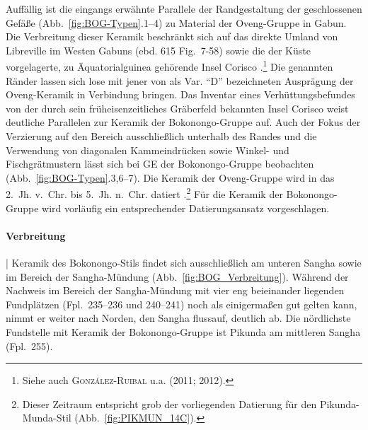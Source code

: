 Auffällig ist die eingangs erwähnte Parallele der Randgestaltung der geschlossenen Gefäße (Abb.~\ref{fig:BOG-Typen}.1--4) zu Material der Oveng-Gruppe in Gabun. Die Verbreitung dieser Keramik beschränkt sich auf das direkte Umland von Libreville im Westen Gabuns (ebd. 615 Fig.~7-58) sowie die der Küste vorgelagerte, zu Äquatorialguinea gehörende Insel Corisco \parencite[217--221]{SanchezElipe.2015}.\footnote{Siehe auch \textsc{González-Ruibal} u.a. (2011; 2012).} Die genannten Ränder lassen sich lose mit  jener von \textcite[559 Abb.~7-18.D]{Clist.20042005} als Var. \enquote{D} bezeichneten Ausprägung der Oveng-Keramik in Verbindung bringen. Das Inventar eines Verhüttungsbefundes von der durch sein früheisenzeitliches Gräberfeld bekannten Insel Corisco \parencite[134 Abb.~15]{GonzalesRuibal.2012} weist deutliche Parallelen zur Keramik der Bokonongo-Gruppe auf. Auch der Fokus der Verzierung auf den Bereich ausschließlich unterhalb des Randes und die Verwendung von diagonalen Kammeindrücken sowie Winkel- und Fischgrätmustern lässt sich bei GE der Bokonongo-Gruppe beobachten (Abb.~\ref{fig:BOG-Typen}.3,6--7). Die Keramik der Oveng-Gruppe wird in das 2.~Jh. v.~Chr. bis 5.~Jh. n.~Chr. datiert \parencite[555 Fig.~7-14]{Clist.20042005}.\footnote{Dieser Zeitraum entspricht grob der vorliegenden Datierung für den Pikunda-Munda-Stil (Abb.~\ref{fig:PIKMUN_14C}).} Für die Keramik der Bokonongo-Gruppe wird vorläufig ein entsprechender Datierungsansatz vorgeschlagen.

\paragraph{Verbreitung}\hspace{-.5em}|\hspace{.5em}%
Keramik des Bokonongo-Stils findet sich ausschließlich am unteren \mbox{Sangha} sowie im Bereich der \mbox{Sangha}-Mündung (Abb.~\ref{fig:BOG_Verbreitung}). Während der Nachweis im Bereich der \mbox{Sangha}-Mündung mit vier eng beieinander liegenden Fundplätzen (Fpl.~235--236 und 240--241) noch als einigermaßen gut gelten kann, nimmt er weiter nach Norden, den \mbox{Sangha} flussauf, deutlich ab. Die nördlichste Fundstelle mit Keramik der Bokonongo-Gruppe ist Pikunda am mittleren \mbox{Sangha} (Fpl.~255).
